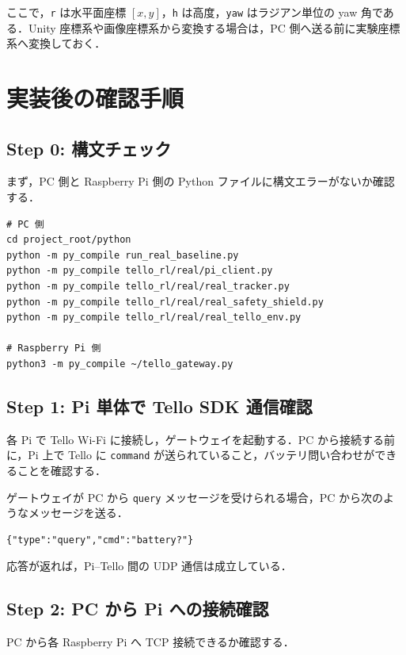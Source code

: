 ここで，\texttt{r} は水平面座標 $[x,y]$，\texttt{h} は高度，\texttt{yaw} はラジアン単位の yaw 角である．Unity 座標系や画像座標系から変換する場合は，PC 側へ送る前に実験座標系へ変換しておく．

\section{実装後の確認手順}
\label{sec:validation_steps}

\subsection{Step 0: 構文チェック}

まず，PC 側と Raspberry Pi 側の Python ファイルに構文エラーがないか確認する．

\begin{lstlisting}
# PC 側
cd project_root/python
python -m py_compile run_real_baseline.py
python -m py_compile tello_rl/real/pi_client.py
python -m py_compile tello_rl/real/real_tracker.py
python -m py_compile tello_rl/real/real_safety_shield.py
python -m py_compile tello_rl/real/real_tello_env.py

# Raspberry Pi 側
python3 -m py_compile ~/tello_gateway.py
\end{lstlisting}

\subsection{Step 1: Pi 単体で Tello SDK 通信確認}

各 Pi で Tello Wi-Fi に接続し，ゲートウェイを起動する．PC から接続する前に，Pi 上で Tello に \texttt{command} が送られていること，バッテリ問い合わせができることを確認する．

ゲートウェイが PC から \texttt{query} メッセージを受けられる場合，PC から次のようなメッセージを送る．

\begin{lstlisting}
{"type":"query","cmd":"battery?"}
\end{lstlisting}

応答が返れば，Pi--Tello 間の UDP 通信は成立している．

\subsection{Step 2: PC から Pi への接続確認}

PC から各 Raspberry Pi へ TCP 接続できるか確認する．

